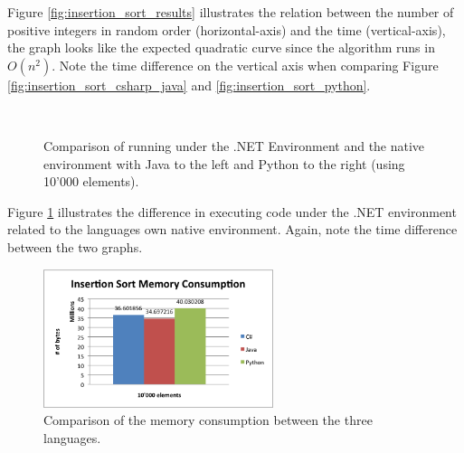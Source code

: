 Figure \ref{fig:insertion_sort_results} illustrates the relation between the number of positive integers in random order (horizontal-axis) and the time (vertical-axis), the graph looks like the expected quadratic curve since the algorithm runs in $O(n^2)$. Note the time difference on the vertical axis when comparing Figure \ref{fig:insertion_sort_csharp_java} and \ref{fig:insertion_sort_python}.

\begin{figure}[h]
	\centering
	\mbox{
	}
	\caption{Comparison of running under the .NET Environment and the native environment with Java to the left and Python to the right (using 10'000 elements).}
	\label{fig:insertion_sort_natives}
\end{figure}

Figure \ref{fig:insertion_sort_natives} illustrates the difference in executing code under the .NET environment related to the languages own native environment. Again, note the time difference between the two graphs.

\begin{figure}[h]
	\centering
	\includegraphics[width=0.6\textwidth]{chapters/media/insertion_sort_memory.png}
	\caption{Comparison of the memory consumption between the three languages.}
	\label{fig:insertion_sort_memory}
\end{figure}

